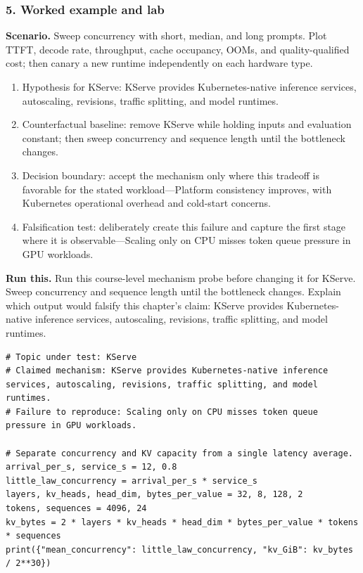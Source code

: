\subsubsection*{5. Worked example and lab}
\textbf{Scenario.} Sweep concurrency with short, median, and long prompts. Plot TTFT, decode rate, throughput, cache occupancy, OOMs, and quality-qualified cost; then canary a new runtime independently on each hardware type.
\begin{enumerate}
\item Hypothesis for KServe: KServe provides Kubernetes-native inference services, autoscaling, revisions, traffic splitting, and model runtimes.
\item Counterfactual baseline: remove KServe while holding inputs and evaluation constant; then sweep concurrency and sequence length until the bottleneck changes.
\item Decision boundary: accept the mechanism only where this tradeoff is favorable for the stated workload—Platform consistency improves, with Kubernetes operational overhead and cold-start concerns.
\item Falsification test: deliberately create this failure and capture the first stage where it is observable—Scaling only on CPU misses token queue pressure in GPU workloads.
\end{enumerate}
\textbf{Run this.} Run this course-level mechanism probe before changing it for KServe. Sweep concurrency and sequence length until the bottleneck changes. Explain which output would falsify this chapter's claim: KServe provides Kubernetes-native inference services, autoscaling, revisions, traffic splitting, and model runtimes.
\begin{Verbatim}[fontsize=\scriptsize]
# Topic under test: KServe
# Claimed mechanism: KServe provides Kubernetes-native inference services, autoscaling, revisions, traffic splitting, and model runtimes.
# Failure to reproduce: Scaling only on CPU misses token queue pressure in GPU workloads.

# Separate concurrency and KV capacity from a single latency average.
arrival_per_s, service_s = 12, 0.8
little_law_concurrency = arrival_per_s * service_s
layers, kv_heads, head_dim, bytes_per_value = 32, 8, 128, 2
tokens, sequences = 4096, 24
kv_bytes = 2 * layers * kv_heads * head_dim * bytes_per_value * tokens * sequences
print({"mean_concurrency": little_law_concurrency, "kv_GiB": kv_bytes / 2**30})
\end{Verbatim}
